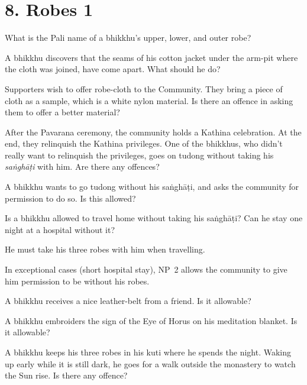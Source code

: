 \chapter{8. Robes 1}
\renewcommand*{\theChapterTitle}{8. Robes 1}

What is the Pali name of a bhikkhu's upper, lower, and outer robe?

\bigskip

A bhikkhu discovers that the seams of his cotton jacket under the arm-pit where
the cloth was joined, have come apart. What should he do?

\bigskip

Supporters wish to offer robe-cloth to the Community. They bring a piece of cloth as a sample, which
is a white nylon material. Is there an offence in asking them to offer a better
material?

\bigskip

After the Pavarana ceremony, the community holds a Kathina celebration.
At the end, they relinquish the Kathina privileges.
One of the bhikkhus, who didn't really want to relinquish the privileges,
goes on tudong without taking his \emph{saṅghāṭi} with him.
Are there any offences?

\bigskip

A bhikkhu wants to go tudong without his saṅghāṭi, and asks the community for
permission to do so. Is this allowed?

\bigskip

Is a bhikkhu allowed to travel home without taking his saṅghāṭi? Can he stay one
night at a hospital without it?

\begin{solution}
  He must take his three robes with him when travelling.

  In exceptional cases (short hospital stay), NP~2 allows the community to give
  him permission to be without his robes.
\end{solution}

\bigskip

A bhikkhu receives a nice leather-belt from a friend. Is it allowable?

\bigskip

A bhikkhu embroiders the sign of the Eye of Horus on his meditation blanket. Is it
allowable?

\bigskip

A bhikkhu keeps his three robes in his kuti where he spends the night.
Waking up early while it is still dark, he goes for a walk outside the monastery to watch the Sun rise.
Is there any offence?


